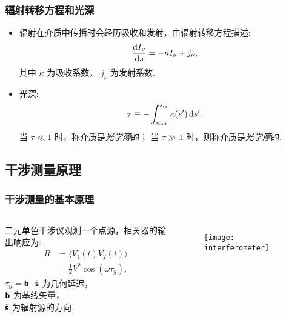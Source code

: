 \documentclass{beamer}
\begin{document}
\begin{frame}[subsec]
  \frametitle{辐射转移方程和光深}
  \begin{itemize}
    \item 辐射在介质中传播时会经历吸收和发射，由\alert{辐射转移方程}描述:
      \begin{equation}
        \frac{\text{d}I_{\nu}}{\text{d}s} = -\kappa I_{\nu} + j_{\nu} ,
      \end{equation}
      其中 $\kappa$ 为吸收系数， $j_{\nu}$ 为发射系数.
    \item \alert{光深}:
      \begin{equation}
        \tau \equiv
          - \int_{s_{\text{out}}}^{s_{\text{in}}} \kappa(s') \,\text{d}s' .
      \end{equation}
      当 $\tau \ll 1$ 时，称介质是\emph{光学薄}的；
      当 $\tau \gg 1$ 时，则称介质是\emph{光学厚}的.
  \end{itemize}
\end{frame}

\subsection{干涉测量原理}

\begin{frame}[subsec]
  \frametitle{干涉测量的基本原理}
  \begin{columns}[onlytextwidth]
    二元单色干涉仪观测一个点源，相关器的输出响应为:
    \begin{align}
      R & = \langle V_1(t) V_2(t) \rangle \\
        & = \frac{1}{2} V^2 \cos (\omega \tau_g) ,
    \end{align}
    $\tau_g = \bm{\mathsf{b}} \cdot \hat{\bm{\mathsf{s}}}$ 为几何延迟，\\
    $\bm{\mathsf{b}}$ 为基线矢量，\\
    $\hat{\bm{\mathsf{s}}}$ 为辐射源的方向.

    \begin{figure}
      \centering
      \texttt{[image: interferometer]}
    \end{figure}
  \end{columns}

\end{frame}
\end{document}
